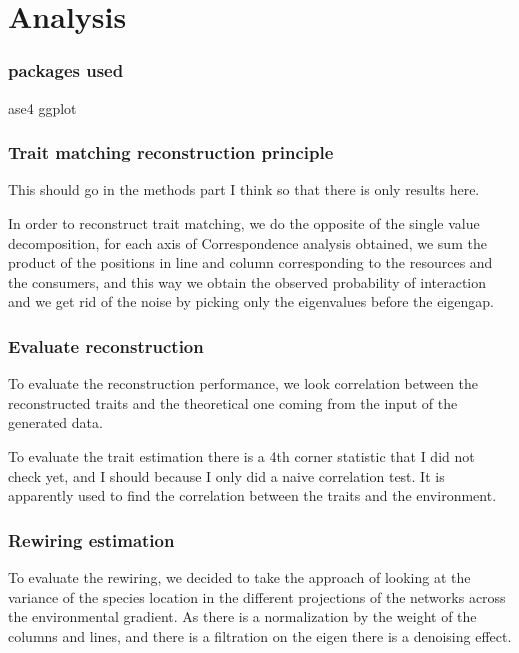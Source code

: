\documentclass{article}
\begin{document}
\section{Analysis}

\subsubsection{packages used}

ase4 ggplot

\subsubsection{Trait matching reconstruction principle}

This should go in the methods part I think so that there is only results here.

In order to reconstruct trait matching, we do the opposite of the single value decomposition, for each axis of Correspondence analysis obtained, we sum the product of the positions in line and column corresponding to the resources and the consumers, and this way we obtain the observed probability of interaction and we get rid of the noise by picking only the eigenvalues before the eigengap.

\subsubsection{Evaluate reconstruction}

To evaluate the reconstruction performance, we look correlation between the reconstructed traits and the theoretical one coming from the input of the generated data.

To evaluate the trait estimation there is a 4th corner statistic that I did not check yet, and I should because I only did a naive correlation test. It is apparently used to find the correlation between the traits and the environment.

\subsubsection{Rewiring estimation}

To evaluate the rewiring, we decided to take the approach of looking at the variance of the species location in the different projections of the networks across the environmental gradient. 
As there is a normalization by the weight of the columns and lines, and there is a filtration on the eigen there is a denoising effect.
\end{document}

